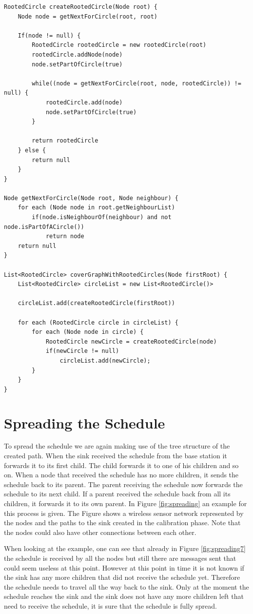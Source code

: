 \begin{lstlisting}
RootedCircle createRootedCircle(Node root) {
	Node node = getNextForCircle(root, root)	

	If(node != null) {
		RootedCircle rootedCircle = new rootedCircle(root)
		rootedCircle.addNode(node)
		node.setPartOfCircle(true)

		while((node = getNextForCircle(root, node, rootedCircle)) != null) {
			rootedCircle.add(node)
			node.setPartOfCircle(true)
		}

		return rootedCircle
	} else {
		return null
	}
}

Node getNextForCircle(Node root, Node neighbour) {
	for each (Node node in root.getNeighbourList)	
		if(node.isNeighbourOf(neighbour) and not node.isPartOfACircle())
			return node
	return null
}

List<RootedCircle> coverGraphWithRootedCircles(Node firstRoot) {
	List<RootedCircle> circleList = new List<RootedCircle()>
	
	circleList.add(createRootedCircle(firstRoot))

	for each (RootedCircle circle in circleList) {
		for each (Node node in circle) {
			RootedCircle newCircle = createRootedCircle(node)
			if(newCircle != null)
				circleList.add(newCircle);
		}
	}
}
\end{lstlisting}

\section{Spreading the Schedule}
\label{chp:apr_spreadingSchedule}
To spread the schedule we are again making use of the tree structure of the created path. When the sink received the schedule from the base station it forwards it to its first child. The child forwards it to one of his children and so on. When a node that received the schedule has no more children, it sends the schedule back to its parent. The parent receiving the schedule now forwards the schedule to its next child. If a parent received the schedule back from all its children, it forwards it to its own parent. In Figure \ref{fig:spreading} an example for this process is given. The Figure shows a wireless sensor network represented by the nodes and the paths to the sink created in the calibration phase. Note that the nodes could also have other connections between each other. 

When looking at the example, one can see that already in Figure \ref{fig:spreading7} the schedule is received by all the nodes but still there are messages sent that could seem useless at this point. However at this point in time it is not known if the sink has any more children that did not receive the schedule yet. Therefore the schedule needs to travel all the way back to the sink. Only at the moment the schedule reaches the sink and the sink does not have any more children left that need to receive the schedule, it is sure that the schedule is fully spread.

